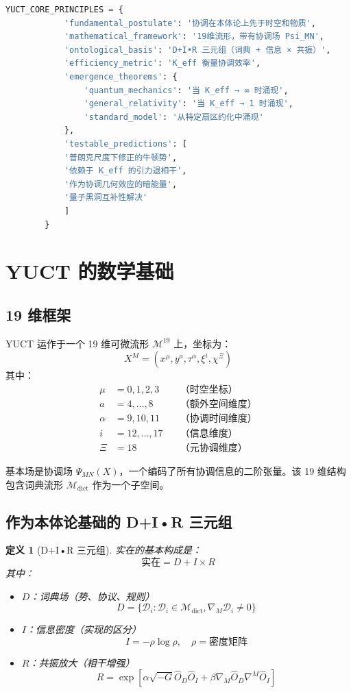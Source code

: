 \documentclass[11pt,a4paper]{article}
\newcommand{\Mdict}{\mathcal{M}_{\text{dict}}}
\newcommand{\Dict}{\mathcal{D}}
\newtheorem{definition}[theorem]{定义}
\theoremstyle{remark}
\begin{document}
	\begin{lstlisting}[language=Python, caption={YUCT 核心原理}, label={lst:yuct-core}]
		YUCT_CORE_PRINCIPLES = {
			'fundamental_postulate': '协调在本体论上先于时空和物质',
			'mathematical_framework': '19维流形，带有协调场 Psi_MN',
			'ontological_basis': 'D+I•R 三元组（词典 + 信息 × 共振）',
			'efficiency_metric': 'K_eff 衡量协调效率',
			'emergence_theorems': {
				'quantum_mechanics': '当 K_eff → ∞ 时涌现',
				'general_relativity': '当 K_eff → 1 时涌现',
				'standard_model': '从特定扇区约化中涌现'
			},
			'testable_predictions': [
			'普朗克尺度下修正的牛顿势',
			'依赖于 K_eff 的引力退相干',
			'作为协调几何效应的暗能量',
			'量子黑洞互补性解决'
			]
		}
	\end{lstlisting}
	
	\section{YUCT 的数学基础}
	\label{sec:mathematical-foundations}
	
	\subsection{19 维框架}
	
	YUCT 运作于一个 19 维可微流形 $\mathcal{M}^{19}$ 上，坐标为：
	\[
	X^M = (x^\mu, y^a, \tau^\alpha, \xi^i, \chi^\Xi)
	\]
	其中：
	\begin{align*}
		\mu &= 0,1,2,3 \quad &\text{（时空坐标）} \\
		a &= 4,\dots,8 \quad &\text{（额外空间维度）} \\
		\alpha &= 9,10,11 \quad &\text{（协调时间维度）} \\
		i &= 12,\dots,17 \quad &\text{（信息维度）} \\
		\Xi &= 18 \quad &\text{（元协调维度）}
	\end{align*}
	
	基本场是协调场 $\Psi_{MN}(X)$，一个编码了所有协调信息的二阶张量。该 19 维结构包含词典流形 $\Mdict$ 作为一个子空间。
	
	\subsection{作为本体论基础的 D+I•R 三元组}
	
	\begin{definition}[D+I•R 三元组]
		实在的基本构成是：
		\[
		\text{实在} = D + I \times R
		\]
		其中：
		\begin{itemize}
			\item $D$：词典场（势、协议、规则）
			\[
			D = \{\Dict_i : \Dict_i \in \Mdict, \nabla_M \Dict_i \neq 0\}
			\]
			\item $I$：信息密度（实现的区分）
			\[
			I = -\rho \log \rho, \quad \rho = \text{密度矩阵}
			\]
			\item $R$：共振放大（相干增强）
			\[
			R = \exp\left[\alpha \sqrt{-G} \hat{O}_D \hat{O}_I + \beta \nabla_M\hat{O}_D \nabla^M\hat{O}_I\right]
			\]
		\end{itemize}
	\end{definition}
	
\end{document}
